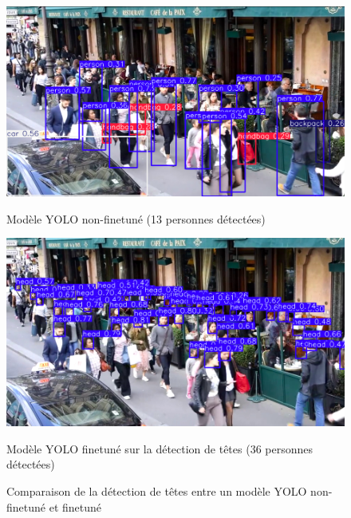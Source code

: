 \begin{figure}[h]
    \centering
    \begin{minipage}{0.45\textwidth}
        \centering
        \includegraphics[width=\textwidth]{images/YOLO.png}
        \caption{Modèle YOLO non-finetuné (13 personnes détectées)}
    \end{minipage}
    \hfill
    \begin{minipage}{0.45\textwidth}
        \centering
        \includegraphics[width=\textwidth]{images/YOLOfinetuned.png}
        \caption{Modèle YOLO finetuné sur la détection de têtes (36 personnes détectées)}
    \end{minipage}
    \caption{Comparaison de la détection de têtes entre un modèle YOLO non-finetuné et finetuné}
    \label{fig:heads-detection-compare}
\end{figure}
